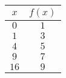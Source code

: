 \begin{tabular}{cc} \toprule
$x$  & $f(x)$ \\\midrule
$0$  & $1$    \\
$1$  & $3$    \\
$4$  & $5$    \\
$9$  & $7$    \\
$16$ & $9$    \\\bottomrule
\end{tabular}
